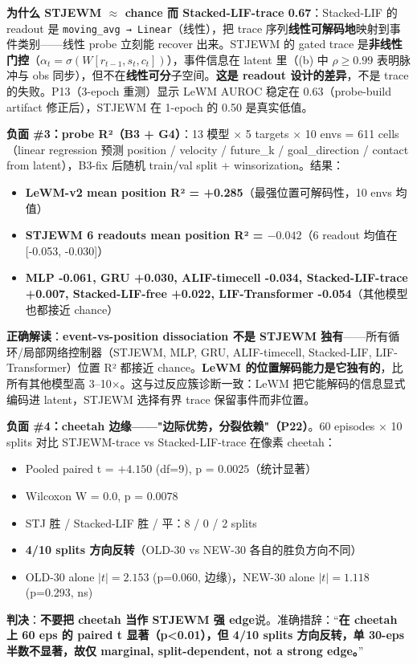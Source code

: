 \documentclass[11pt,a4paper]{article}
\begin{document}
\textbf{为什么 STJEWM $\approx$ chance 而 Stacked-LIF-trace 0.67}：Stacked-LIF 的 readout 是 \texttt{moving\_avg → Linear}（线性），把 trace 序列\textbf{线性可解码地}映射到事件类别——线性 probe 立刻能 recover 出来。STJEWM 的 gated trace 是\textbf{非线性门控}（$\alpha_t = \sigma(W[r_{t-1}, s_t, c_t])$），事件信息在 latent 里（(b) 中 $\rho \geq 0.99$ 表明脉冲与 obs 同步），但不在\textbf{线性可分}子空间。\textbf{这是 readout 设计的差异}，不是 trace 的失败。P13（3-epoch 重测）显示 LeWM AUROC 稳定在 0.63（probe-build artifact 修正后），STJEWM 在 1-epoch 的 0.50 是真实低值。

\textbf{负面 \#3：probe R²（B3 + G4）}：13 模型 × 5 targets × 10 envs = 611 cells（linear regression 预测 position / velocity / future\_k / goal\_direction / contact from latent），B3-fix 后随机 train/val split + winsorization。结果：
\begin{itemize}[leftmargin=2em]
\item \textbf{LeWM-v2 mean position R² = +0.285}（最强位置可解码性，10 envs 均值）
\item \textbf{STJEWM 6 readouts mean position R² = $-0.042$}（6 readout 均值在 [-0.053, -0.030]）
\item \textbf{MLP -0.061, GRU +0.030, ALIF-timecell -0.034, Stacked-LIF-trace +0.007, Stacked-LIF-free +0.022, LIF-Transformer -0.054}（其他模型也都接近 chance）
\end{itemize}
\textbf{正确解读}：\textbf{event-vs-position dissociation 不是 STJEWM 独有}——所有循环/局部网络控制器（STJEWM, MLP, GRU, ALIF-timecell, Stacked-LIF, LIF-Transformer）位置 R² 都接近 chance。\textbf{LeWM 的位置解码能力是它独有的}，比所有其他模型高 3--10$\times$。这与过反应簇诊断一致：LeWM 把它能解码的信息显式编码进 latent，STJEWM 选择有界 trace 保留事件而非位置。

\textbf{负面 \#4：cheetah 边缘——"边际优势，分裂依赖"（P22）}。60 episodes × 10 splits 对比 STJEWM-trace vs Stacked-LIF-trace 在像素 cheetah：
\begin{itemize}[leftmargin=2em]
\item Pooled paired t = $+4.150$ (df=9), p = $0.0025$（统计显著）
\item Wilcoxon W = $0.0$, p = $0.0078$
\item STJ 胜 / Stacked-LIF 胜 / 平：8 / 0 / 2 splits
\item \textbf{4/10 splits 方向反转}（OLD-30 vs NEW-30 各自的胜负方向不同）
\item OLD-30 alone $|t|=2.153$ (p=0.060, 边缘)，NEW-30 alone $|t|=1.118$ (p=0.293, ns)
\end{itemize}
\textbf{判决}：\textbf{不要把 cheetah 当作 STJEWM 强 edge}说。准确措辞：``\textbf{在 cheetah 上 60 eps 的 paired t 显著（p<0.01），但 4/10 splits 方向反转，单 30-eps 半数不显著，故仅 marginal, split-dependent, not a strong edge。}''
\end{document}
